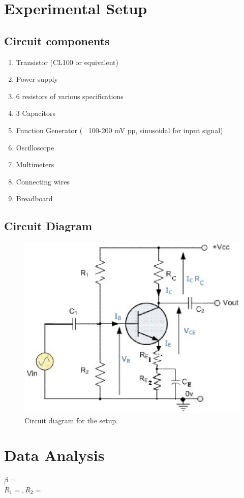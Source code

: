 \section{Experimental Setup}

\subsection*{Circuit components}
    \begin{enumerate}
        \item Transistor (CL100 or equivalent)
        \item Power supply
        \item 6 resistors of various specifications
        \item 3 Capacitors 
        \item Function Generator (~ 100-200 mV pp, sinusoidal for input signal)
        \item Oscilloscope
        \item Multimeters
        \item Connecting wires
        \item Breadboard
    \end{enumerate}

    \subsection*{Circuit Diagram}
    \begin{figure}[H]
        \centering
        \includegraphics[width=1\columnwidth]{images/f1.png}
        \caption{Circuit diagram for the setup.}
        \label{fig:1}
    \end{figure}

\section{Data Analysis}
$\beta = $\\
$R_1=, R_2=$